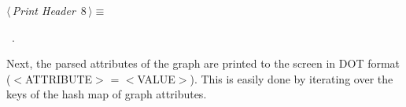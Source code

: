 \documentclass[a4paper]{report}
\begin{document}
\begin{flushleft} \small
\begin{minipage}{\linewidth}\label{scrap8}\raggedright\small
{} $\langle\,${\itshape Print Header}\nobreak\ {\footnotesize {8}}$\,\rangle\equiv$
\vspace{-1ex}
\begin{list}{}{} \item
\mbox{}\verb@@\\
\mbox{}\verb@boolean directed = this.attributes.get("directed").equals("1");@\\
\mbox{}\verb@if (directed){@\\
\mbox{}\verb@        System.out.println("digraph G {");@\\
\mbox{}\verb@}   @\\
\mbox{}\verb@else{@\\
\mbox{}\verb@        System.out.println("graph G {");@\\
\mbox{}\verb@}   @\\
\mbox{}\verb@@\\
\mbox{}\verb@this.attributes.remove("directed");@\\
\mbox{}\verb@@{\NWsep}
\end{list}
\vspace{-1.5ex}
\footnotesize
\begin{list}{}{\setlength{\itemsep}{-\parsep}\setlength{\itemindent}{-\leftmargin}}
\item \NWtxtMacroRefIn\ .

\item{}
\end{list}
\end{minipage}\vspace{4ex}
\end{flushleft}
Next, the parsed attributes of the graph are printed to the screen in DOT format ($<$ATTRIBUTE$>$ = $<$VALUE$>$). This is easily done by iterating over the keys of the hash map of graph attributes.
\end{document}
